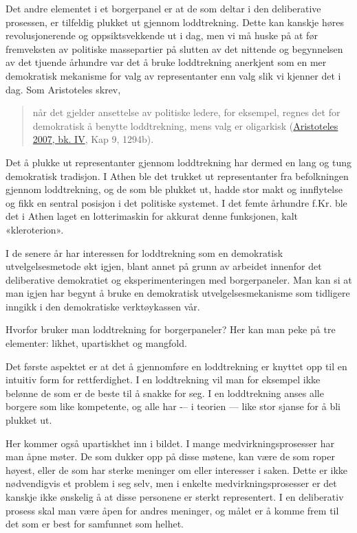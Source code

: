 \documentclass[
  12pt,
  a4paper, 12pt]{article}
\begin{document}
Det andre elementet i et borgerpanel er at de som deltar i den deliberative prosessen, er tilfeldig plukket ut gjennom loddtrekning. Dette kan kanskje høres revolusjonerende og oppsiktsvekkende ut i dag, men vi må huske på at før fremveksten av politiske massepartier på slutten av det nittende og begynnelsen av det tjuende århundre var det å bruke loddtrekning anerkjent som en mer demokratisk mekanisme for valg av representanter enn valg slik vi kjenner det i dag. Som Aristoteles skrev,

\begin{quote}
når det gjelder ansettelse av politiske ledere, for eksempel, regnes det for demokratisk å benytte loddtrekning, mens valg er oligarkisk (\protect\hyperlink{ref-aristoteles_politikk_2007}{Aristoteles 2007, bk. IV}, Kap 9, 1294b).
\end{quote}

Det å plukke ut representanter gjennom loddtrekning har dermed en lang og tung demokratisk tradisjon. I Athen ble det trukket ut representanter fra befolkningen gjennom loddtrekning, og de som ble plukket ut, hadde stor makt og innflytelse og fikk en sentral posisjon i det politiske systemet. I det femte århundre f.Kr. ble det i Athen laget en lotterimaskin for akkurat denne funksjonen, kalt «kleroterion».

I de senere år har interessen for loddtrekning som en demokratisk utvelgelsesmetode økt igjen, blant annet på grunn av arbeidet innenfor det deliberative demokratiet og eksperimenteringen med borgerpaneler. Man kan si at man igjen har begynt å bruke en demokratisk utvelgelsesmekanisme som tidligere inngikk i den demokratiske verktøykassen vår.

Hvorfor bruker man loddtrekning for borgerpaneler? Her kan man peke på tre elementer: likhet, upartiskhet og mangfold.

Det første aspektet er at det å gjennomføre en loddtrekning er knyttet opp til en intuitiv form for rettferdighet. I en loddtrekning vil man for eksempel ikke belønne de som er de beste til å snakke for seg. I en loddtrekning anses alle borgere som like kompetente, og alle har -\/-- i teorien --- like stor sjanse for å bli plukket ut.

Her kommer også upartiskhet inn i bildet. I mange medvirkningsprosesser har man åpne møter. De som dukker opp på disse møtene, kan være de som roper høyest, eller de som har sterke meninger om eller interesser i saken. Dette er ikke nødvendigvis et problem i seg selv, men i enkelte medvirkningsprosesser er det kanskje ikke ønskelig å at disse personene er sterkt representert. I en deliberativ prosess skal man være åpen for andres meninger, og målet er å komme frem til det som er best for samfunnet som helhet.
\end{document}
